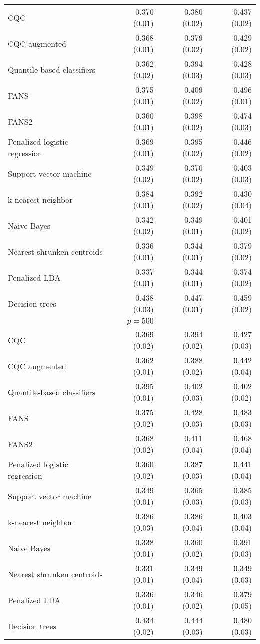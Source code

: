\begin{table}[p]
\begin{adjustbox}{max size={\textwidth}{10cm}}
\begin{tabular}{l@{\extracolsep{15mm}}rrr}
      CQC & 0.370 (0.01) & 0.380 (0.02) & 0.437 (0.02) \\ 
      CQC augmented & 0.368 (0.01) & 0.379 (0.02) & 0.429 (0.02) \\ 
      Quantile-based classifiers & 0.362 (0.02) & 0.394 (0.03) & 0.428 (0.03) \\ 
      FANS  & 0.375 (0.01) & 0.409 (0.02) & 0.496 (0.01) \\
      FANS2 & 0.360 (0.01) & 0.398 (0.02) & 0.474 (0.03) \\
      Penalized logistic regression & 0.369 (0.01) & 0.395 (0.02) & 0.446 (0.02) \\ 
      Support vector machine & 0.349 (0.02) & 0.370 (0.02) & 0.403 (0.03) \\ 
      k-nearest neighbor & 0.384 (0.01) & 0.392 (0.02) & 0.430 (0.04) \\ 
      Naive Bayes & 0.342 (0.02) & 0.349 (0.01) & 0.401 (0.02) \\ 
      Nearest shrunken centroids & 0.336 (0.01) & 0.344 (0.01) & 0.379 (0.02) \\ 
      Penalized LDA & 0.337 (0.01) & 0.344 (0.01) & 0.374 (0.02) \\ 
      Decision trees & 0.438 (0.03) & 0.447 (0.01) & 0.459 (0.02) \\ [2ex]

      \hline
      & $p = 500$ \\
      \hline

      CQC & 0.369 (0.02) & 0.394 (0.02) & 0.427 (0.03) \\ 
      CQC augmented & 0.362 (0.01) & 0.388 (0.02) & 0.442 (0.04) \\ 
      Quantile-based classifiers & 0.395 (0.01) & 0.402 (0.03) & 0.402 (0.02) \\ 
      FANS  & 0.375 (0.02) & 0.428 (0.03) & 0.483 (0.03) \\
      FANS2 & 0.368 (0.02) & 0.411 (0.04) & 0.468 (0.04) \\
      Penalized logistic regression & 0.360 (0.02) & 0.387 (0.03) & 0.441 (0.04) \\ 
      Support vector machine & 0.349 (0.01) & 0.365 (0.03) & 0.385 (0.03) \\ 
      k-nearest neighbor & 0.386 (0.03) & 0.386 (0.04) & 0.403 (0.04) \\ 
      Naive Bayes & 0.338 (0.01) & 0.360 (0.02) & 0.391 (0.03) \\ 
      Nearest shrunken centroids & 0.331 (0.01) & 0.349 (0.04) & 0.349 (0.03) \\ 
      Penalized LDA & 0.336 (0.01) & 0.346 (0.02) & 0.379 (0.05) \\ 
      Decision trees & 0.434 (0.02) & 0.444 (0.03) & 0.480 (0.03) \\

      \hline
      
    \end{tabular}
  \end{adjustbox}
\end{table}




